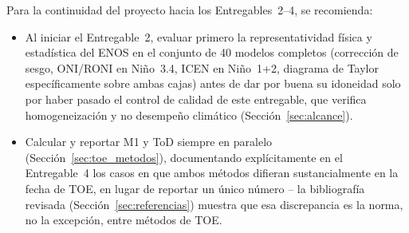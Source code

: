 \documentclass[11pt,a4paper]{article}
\begin{document}
Para la continuidad del proyecto hacia los Entregables~2--4, se recomienda:

\begin{itemize}
\item Al iniciar el Entregable~2, evaluar primero la representatividad f\'isica y estad\'istica del ENOS en el conjunto de 40 modelos completos (correcci\'on de sesgo, ONI/RONI en Ni\~no~3.4, ICEN en Ni\~no~1+2, diagrama de Taylor espec\'ificamente sobre ambas cajas) antes de dar por buena su idoneidad solo por haber pasado el control de calidad de este entregable, que verifica homogeneizaci\'on y no desempe\~no clim\'atico (Secci\'on~\ref{sec:alcance}).
\item Calcular y reportar M1 y ToD siempre en paralelo (Secci\'on~\ref{sec:toe_metodos}), documentando expl\'icitamente en el Entregable~4 los casos en que ambos m\'etodos difieran sustancialmente en la fecha de TOE, en lugar de reportar un \'unico n\'umero -- la bibliograf\'ia revisada (Secci\'on~\ref{sec:referencias}) muestra que esa discrepancia es la norma, no la excepci\'on, entre m\'etodos de TOE.
\end{itemize}

\newpage



\newpage
\end{document}

